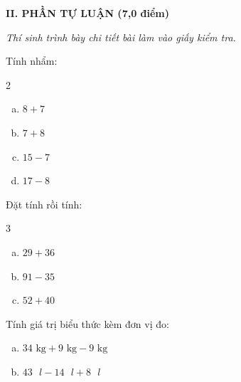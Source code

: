 \vspace{4mm}
\textbf{\large II. PHẦN TỰ LUẬN (7,0 điểm)}

{\itshape Thí sinh trình bày chi tiết bài làm vào giấy kiểm tra.}

\begin{bt}[1,0 điểm]
Tính nhẩm:
\begin{multicols}{2}
\begin{enumerate}[a)]
  \item $8 + 7$
  \item $7 + 8$
  \item $15 - 7$
  \item $17 - 8$
\end{enumerate}
\end{multicols}
\end{bt}

\begin{bt}[1,5 điểm]
Đặt tính rồi tính:
\begin{multicols}{3}
\begin{enumerate}[a)]
  \item $29 + 36$
  \item $91 - 35$
  \item $52 + 40$
\end{enumerate}
\end{multicols}
\end{bt}

\begin{bt}[1,0 điểm]
Tính giá trị biểu thức kèm đơn vị đo:
\begin{enumerate}[a)]
  \item $34\text{ kg} + 9\text{ kg} - 9\text{ kg}$
  \item $43\text{ }l - 14\text{ }l + 8\text{ }l$
\end{enumerate}
\end{bt}

